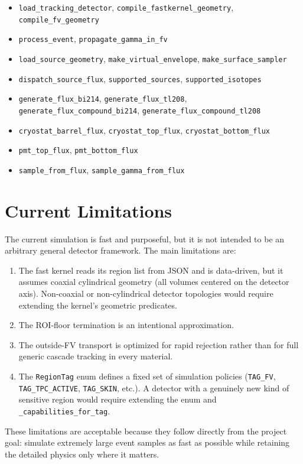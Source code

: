 \documentclass[11pt]{article}
\begin{document}
\begin{itemize}
\item \texttt{load\_tracking\_detector},
      \texttt{compile\_fastkernel\_geometry},
      \texttt{compile\_fv\_geometry}
\item \texttt{process\_event},
      \texttt{propagate\_gamma\_in\_fv}
\item \texttt{load\_source\_geometry},
      \texttt{make\_virtual\_envelope},
      \texttt{make\_surface\_sampler}
\item \texttt{dispatch\_source\_flux},
      \texttt{supported\_sources},
      \texttt{supported\_isotopes}
\item \texttt{generate\_flux\_bi214},
      \texttt{generate\_flux\_tl208},
      \texttt{generate\_flux\_compound\_bi214},
      \texttt{generate\_flux\_compound\_tl208}
\item \texttt{cryostat\_barrel\_flux},
      \texttt{cryostat\_top\_flux},
      \texttt{cryostat\_bottom\_flux}
\item \texttt{pmt\_top\_flux},
      \texttt{pmt\_bottom\_flux}
\item \texttt{sample\_from\_flux},
      \texttt{sample\_gamma\_from\_flux}
\end{itemize}

\section{Current Limitations}

The current simulation is fast and purposeful, but it is not intended to be an
arbitrary general detector framework. The main limitations are:

\begin{enumerate}[label=\arabic*.]
\item The fast kernel reads its region list from JSON and is data-driven, but
it assumes coaxial cylindrical geometry (all volumes centered on the detector
axis). Non-coaxial or non-cylindrical detector topologies would require
extending the kernel's geometric predicates.
\item The ROI-floor termination is an intentional approximation.
\item The outside-FV transport is optimized for rapid rejection rather than for
full generic cascade tracking in every material.
\item The \texttt{RegionTag} enum defines a fixed set of simulation policies
(\texttt{TAG\_FV}, \texttt{TAG\_TPC\_ACTIVE}, \texttt{TAG\_SKIN}, etc.). A
detector with a genuinely new kind of sensitive region would require extending
the enum and \texttt{\_capabilities\_for\_tag}.
\end{enumerate}

These limitations are acceptable because they follow directly from the project
goal: simulate extremely large event samples as fast as possible while retaining
the detailed physics only where it matters.
\end{document}
